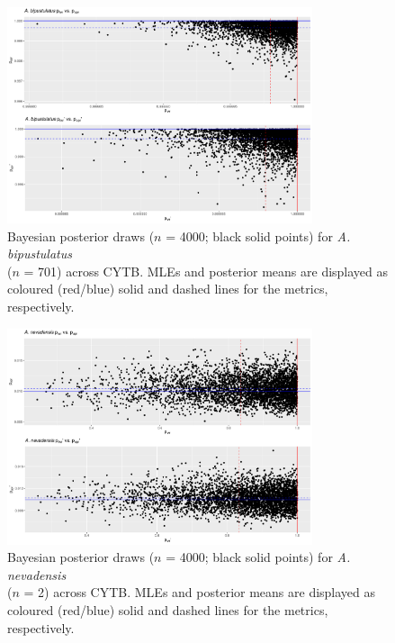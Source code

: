 \documentclass[12pt]{article}
\begin{document}
\begin{landscape}
\begin{table}[H]
\begin{tabular}{cccc}
\hline


\end{tabular}

\end{table}
\end{landscape}

\begin{figure}[H]

\centering

\includegraphics[width=0.80\textwidth]{Figure 3}

\caption{Bayesian posterior draws ($n$ = 4000; black solid points) for \textit{A. bipustulatus} \\ ($n$ = 701) across CYTB. MLEs and posterior means are displayed as coloured (red/blue) solid and dashed lines for the metrics, respectively.}

\end{figure}


\begin{figure}[H]

\centering

\includegraphics[width=0.80\textwidth]{Figure 4}

\caption{Bayesian posterior draws ($n$ = 4000; black solid points) for \textit{A. nevadensis} \\ ($n$ = 2) across CYTB. MLEs and posterior means are displayed as coloured (red/blue) solid and dashed lines for the metrics, respectively.}

\end{figure}
\end{document}
